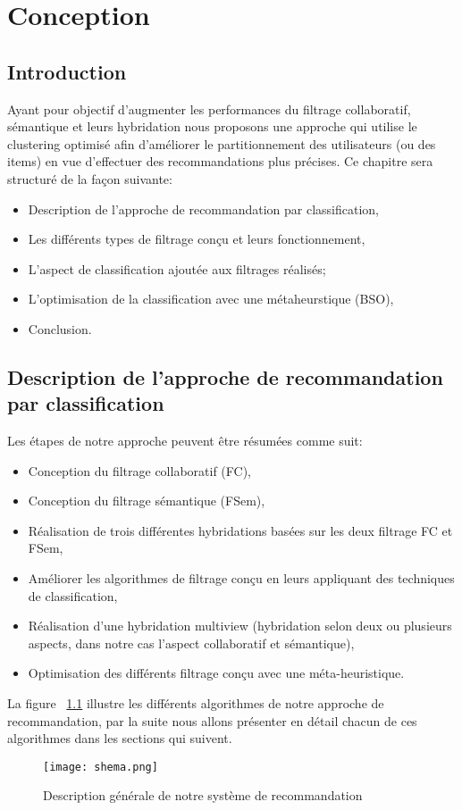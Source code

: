 \chapter{Conception}
\thispagestyle{empty}
\newpage
\section{Introduction}
Ayant pour objectif d’augmenter les performances du filtrage collaboratif, sémantique et leurs hybridation nous proposons une approche qui utilise le clustering optimisé afin d'améliorer le partitionnement des utilisateurs (ou des items) en vue d’effectuer des recommandations plus précises. Ce chapitre sera structuré de la façon suivante:
\begin{itemize}
	\item Description de l'approche de recommandation par classification,
	\item Les différents types de filtrage conçu et leurs fonctionnement,
	\item L'aspect de classification ajoutée aux filtrages réalisés;
	\item L'optimisation de la classification avec une métaheurstique (BSO),
	\item Conclusion.
\end{itemize}

\section{Description de l'approche de recommandation par classification}
Les étapes de notre approche peuvent être résumées comme suit:
\begin{itemize}
\item Conception du filtrage collaboratif (FC),
\item Conception du filtrage sémantique (FSem),
\item Réalisation de trois différentes hybridations basées sur les deux filtrage FC et FSem,
\item Améliorer les algorithmes de filtrage conçu en leurs appliquant des techniques de classification,
\item Réalisation d'une hybridation multiview (hybridation selon deux ou plusieurs aspects, dans notre cas l'aspect collaboratif et sémantique),
\item  Optimisation des différents filtrage conçu avec une méta-heuristique.
\end{itemize}
La figure  ~\ref{fig:shema} illustre les différents algorithmes de notre approche de recommandation, par la suite nous allons présenter en détail chacun de ces algorithmes dans les sections qui suivent.
\begin{figure}[H]
	\centering
	\texttt{[image: shema.png]}
	\caption{Description générale de notre système de recommandation}
	\label{fig:shema}
\end{figure}

